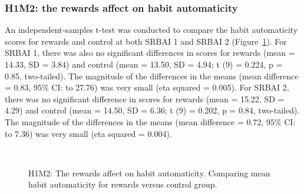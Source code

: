 \subsubsection*{H1M2: the rewards affect on habit automaticity}
An independent-samples t-test was conducted to compare the habit automaticity scores
for rewards and control at both SRBAI 1 and SRBAI 2 (Figure~\ref{fig:m2_h1}). For SRBAI 1, there was also no significant differences in scores for rewards (mean = 14.33, SD = 3.84) and control (mean = 13.50, SD = 4.94; t (9) = 0.224, p = 0.85,
two-tailed). The magnitude of the differences in the means (mean difference = 0.83,
95\% CI:  to 27.76) was very small (eta squared = 0.005). For SRBAI 2, there was no significant difference in scores for rewards
(mean = 15.22, SD = 4.29) and control (mean = 14.50, SD = 6.36; t (9) = 0.202, p = 0.84,
two-tailed). The magnitude of the differences in the means (mean difference = 0.72,
95\% CI:  to 7.36) was very small (eta squared = 0.004).




\begin{figure}[H]
  \centering
  \caption{H1M2: The rewards affect on habit automaticity. Comparing mean habit automaticity for rewards versus control group.}~\label{fig:m2_h1}
\end{figure}


